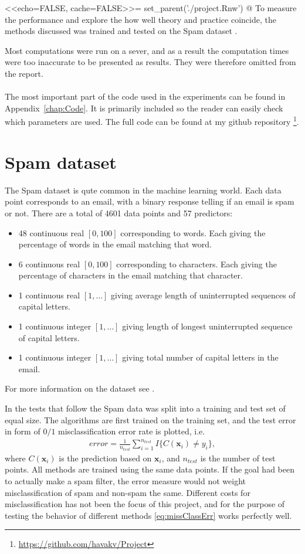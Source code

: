 <<echo=FALSE, cache=FALSE>>=
set_parent('./project.Rnw')
@
%
To measure the performance and explore the how well theory and practice coincide, the methods discussed was trained and tested on the Spam dataset \citep{Spamdata}. 

Most computations were run on a sever, and as a result the computation times were too inaccurate to be presented as results. They were therefore omitted from the report.
\\
\\
The most important part of the code used in the experiments can be found in Appendix~\ref{chap:Code}. It is primarily included so the reader can easily check which parameters are used. The full code can be found at my github repository \footnote{\url{https://github.com/havakv/Project}}.


\section{Spam dataset}
\label{sec:Spam dataset}
 The Spam dataset is qute common in the machine learning world. 
 Each data point corresponds to an email, with a binary response telling if an email is spam or not. There are a total of 4601 data points and 57 predictors:
 \begin{itemize}
   \item 48 continuous real $[0, 100]$ corresponding to words. Each giving the percentage of words in the email matching that word. 
   \item 6 continuous real $[0, 100]$ corresponding to characters. Each giving the percentage of characters in the email matching that character.
   \item 1 continuous real $[1, \ldots]$ giving average length of uninterrupted sequences of capital letters. 
   \item 1 continuous integer $[1, \ldots]$ giving length of longest uninterrupted sequence of capital letters.
   \item 1 continuous integer $[1, \ldots]$ giving total number of capital letters in the email.
 \end{itemize}
 For more information on the dataset see \cite{Spamdata}.

 In the tests that follow the Spam data was split into a training and test set of equal size. The algorithms are first trained on the training set, and the test error in form of $0/1$ misclassification error rate is plotted, i.e.
 \begin{align}
   \label{eq:missClassErr} 
   error =  \frac{1}{n_{test}} \sum_{i = 1}^{n_{test}} I\{C(\mathbf{x}_i) \neq y_i\},
 \end{align}
 where $C(\mathbf{x}_i)$ is the prediction based on $\mathbf{x}_i$, and $n_{test}$ is the number of test points. 
All methods are trained using the same data points. 
If the goal had been to actually make a spam filter, the error measure would not weight misclassification of spam and non-spam the same. Different costs for misclassification has not been the focus of this project, and for the purpose of testing the behavior of different methods \eqref{eq:missClassErr} works perfectly well.


